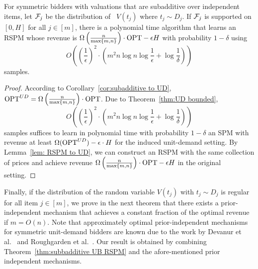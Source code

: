 \begin{theorem}\label{thm:subadditive bounded}
	For symmetric bidders with valuations that are subadditive over independent items, let ${\mathcal{F}}_j$ be the distribution of ~$V(t_j)$ where $t_j\sim D_j$. If ${\mathcal{F}}_j$ is supported on $[0,H]$ for all $j\in[m]$, there is a polynomial time algorithm that learns  an RSPM whose revenue is $\Omega\left(\frac{n}{{\max\{m,n\}}}\right)\cdot \text{OPT} -\epsilon H$ with probability $1-\delta$ using $$O\left(\left(\frac{1}{\epsilon}\right)^2\cdot \left(m^2 n\log n\log \frac{1}{\epsilon} + \log \frac{1}{\delta}\right)\right)$$ samples.%
\end{theorem}
\begin{proof}
	According to Corollary~\ref{cor:subadditive to UD}, $\text{OPT}^{UD}=\Omega\left(\frac{n}{{\max\{m,n\}}}\right)\cdot \text{OPT}$. Due to Theorem~\ref{thm:UD bounded}, $$O\left(\left(\frac{1}{\epsilon}\right)^2\cdot \left(m^2 n\log n\log \frac{1}{\epsilon} + \log \frac{1}{\delta}\right)\right)$$ samples suffices to learn in polynomial time with probability $1-\delta$ an SPM with revenue at least $\Omega(\text{OPT}^{UD})-\epsilon\cdot H$ for the induced unit-demand setting. By Lemma~\ref{lem: RSPM to UD},  we can construct an RSPM with the same collection of prices and achieve revenue $\Omega\left(\frac{n}{{\max\{m,n\}}}\right)\cdot \text{OPT} -\epsilon H$ in the original setting. \end{proof}
	
Finally, if the distribution of the random variable $V(t_j)$ with $t_j\sim D_j$ is regular for all item $j\in[m]$, we prove in the next theorem that there exists a prior-independent mechanism that achieves a constant fraction of the optimal revenue if $m=O(n)$. Note that approximately optimal prior-independent mechanisms for symmetric unit-demand bidders are known due to the work by Devanur et al.~\cite{DevanurHKN11} and Roughgarden et al.~\cite{RoughgardenTY12}. Our result is obtained by combining Theorem~\ref{thm:subbadditive UB RSPM} and the afore-mentioned prior independent mechanisms.

